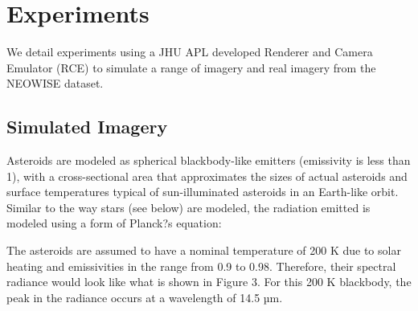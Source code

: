\section{Experiments}
%
%
%
%
%

\label{sec:experiments}

We  detail experiments using a JHU APL developed Renderer and Camera Emulator (RCE) to simulate a range of imagery and real imagery from the NEOWISE dataset.  

\subsection{Simulated Imagery}
\label{ssec:simulated}

Asteroids are  modeled as spherical blackbody-like emitters (emissivity is less than 1), with a cross-sectional area that approximates the sizes of actual asteroids and surface temperatures typical of sun-illuminated asteroids in an Earth-like orbit.  Similar to the way stars (see below) are modeled, the radiation emitted is modeled using a form of Planck?s equation:
 
 The asteroids are assumed to have a nominal temperature of 200 K due to solar heating and emissivities in the range from 0.9 to 0.98. Therefore, their spectral radiance would look like what is shown in Figure 3.  For this 200 K blackbody, the peak in the radiance occurs at a wavelength of 14.5 µm.
 
